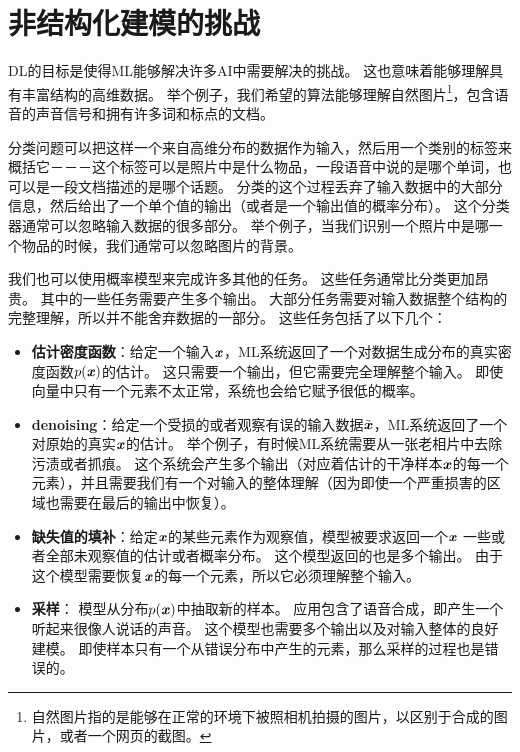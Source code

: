\section{非结构化建模的挑战}
\label{sec:the_challenge_of_unstructured_modelling}


\gls{DL}的目标是使得\gls{ML}能够解决许多\gls{AI}中需要解决的挑战。
这也意味着能够理解具有丰富结构的高维数据。
举个例子，我们希望的算法能够理解自然图片\footnote{自然图片指的是能够在正常的环境下被照相机拍摄的图片，以区别于合成的图片，或者一个网页的截图。}，包含语音的声音信号和拥有许多词和标点的文档。


分类问题可以把这样一个来自高维分布的数据作为输入，然后用一个类别的标签来概括它－－－这个标签可以是照片中是什么物品，一段语音中说的是哪个单词，也可以是一段文档描述的是哪个话题。
分类的这个过程丢弃了输入数据中的大部分信息，然后给出了一个单个值的输出（或者是一个输出值的概率分布）。
这个分类器通常可以忽略输入数据的很多部分。
举个例子，当我们识别一个照片中是哪一个物品的时候，我们通常可以忽略图片的背景。


我们也可以使用概率模型来完成许多其他的任务。
这些任务通常比分类更加昂贵。
其中的一些任务需要产生多个输出。
大部分任务需要对输入数据整个结构的完整理解，所以并不能舍弃数据的一部分。
这些任务包括了以下几个：
\begin{itemize}
\item \textbf{估计密度函数}：给定一个输入$\boldsymbol{\mathit{x}}$，\gls{ML}系统返回了一个对数据生成分布的真实密度函数$p(\boldsymbol{\mathit{x}})$的估计。
这只需要一个输出，但它需要完全理解整个输入。
即使向量中只有一个元素不太正常，系统也会给它赋予很低的概率。
	
	
\item
\textbf{\gls{denoising}}：给定一个受损的或者观察有误的输入数据$\tilde{\boldsymbol{\mathit{x}}}$，\gls{ML}系统返回了一个对原始的真实$\boldsymbol{\mathit{x}}$的估计。
举个例子，有时候\gls{ML}系统需要从一张老相片中去除污渍或者抓痕。
这个系统会产生多个输出（对应着估计的干净样本$\boldsymbol{\mathit{x}}$的每一个元素），并且需要我们有一个对输入的整体理解（因为即使一个严重损害的区域也需要在最后的输出中恢复）。
	
\item
\textbf{缺失值的填补}：给定$\boldsymbol{\mathit{x}}$的某些元素作为观察值，模型被要求返回一个$\boldsymbol{\mathit{x}}$
一些或者全部未观察值的估计或者概率分布。
这个模型返回的也是多个输出。
由于这个模型需要恢复$\boldsymbol{\mathit{x}}$的每一个元素，所以它必须理解整个输入。
	
	
\item \textbf{采样}： 模型从分布$p(\boldsymbol{\mathit{x}})$中抽取新的样本。
应用包含了语音合成，即产生一个听起来很像人说话的声音。
这个模型也需要多个输出以及对输入整体的良好建模。
即使样本只有一个从错误分布中产生的元素，那么采样的过程也是错误的。 
\end{itemize}

